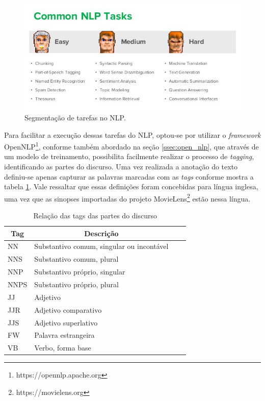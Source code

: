 \begin{figure}
	\centering
	\includegraphics[scale=0.70]{imagens/nlp.jpg}
	\caption{Segmentação de tarefas no NLP. \citep{NLP2016}}
	\label{fig:nlp}
\end{figure}

Para facilitar a execução dessas tarefas do \ac{NLP}, optou-se por utilizar o \textit{framework} OpenNLP\footnote{https://opennlp.apache.org}, conforme também abordado na seção \ref{ssec:open_nlp}, que através de um modelo de treinamento, possibilita facilmente realizar o processo de \textit{tagging}, identificando as partes do discurso. Uma vez realizada a anotação do texto definiu-se apenas capturar as palavras marcadas com as \textit{tags} conforme mostra a tabela \ref{tab:nlp_tags}. Vale ressaltar que essas definições foram concebidas para língua inglesa, uma vez que as sinopses importadas do projeto MovieLens\footnote{https://movielens.org} estão nessa língua.

\begin{table}[H]
	\label{tab:nlp_tags}
	\centering
	\caption{Relação das tags das partes do discurso}
	\def\arraystretch{1.3} %
	\begin{tabular}{| m{1.3cm} | m{9.4cm}| c | m{2cm}}
		\hline
		\multicolumn{1}{|c|}{\bfseries Tag} & \multicolumn{1}{c|}{\bfseries Descrição} \\ \hline
		NN & Substantivo comum, singular ou incontável \\ \hline 	
		NNS	& Substantivo comum, plural \\ \hline
		NNP	& Substantivo próprio, singular \\ \hline
		NNPS & Substantivo próprio, plural \\ \hline
		JJ & Adjetivo \\ \hline
		JJR & Adjetivo comparativo \\ \hline
		JJS & Adjetivo superlativo \\ \hline
		FW & Palavra estrangeira \\ \hline
		VB & Verbo, forma base \\ \hline
	\end{tabular}
\end{table}

